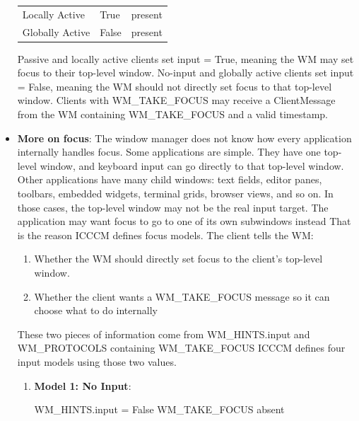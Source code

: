 \documentclass{report}
\begin{document}
\begin{itemize}
\begin{center}
\begin{tabularx}{\textwidth}{@{}Xll@{}}
                    Locally Active	&True	&present\\[2ex]
                    Globally Active	&False	&present\\
                    \bottomrule
                \end{tabularx}
            \end{center}
            Passive and locally active clients set input = True, meaning the WM may set focus to their top-level window. No-input and globally active clients set input = False, meaning the WM should not directly set focus to that top-level window. Clients with WM\_TAKE\_FOCUS may receive a ClientMessage from the WM containing WM\_TAKE\_FOCUS and a valid timestamp.
        \item \textbf{More on focus}: The window manager does not know how every application internally handles focus.
            \bigbreak \noindent 
            Some applications are simple. They have one top-level window, and keyboard input can go directly to that top-level window.
            \bigbreak \noindent 
            Other applications have many child windows: text fields, editor panes, toolbars, embedded widgets, terminal grids, browser views, and so on. In those cases, the top-level window may not be the real input target. The application may want focus to go to one of its own subwindows instead
            \bigbreak \noindent 
            That is the reason ICCCM defines focus models. The client tells the WM:
            \begin{enumerate}
                \item Whether the WM should directly set focus to the client’s top-level window.
                \item Whether the client wants a WM\_TAKE\_FOCUS message so it can choose what to do internally
            \end{enumerate}
            These two pieces of information come from WM\_HINTS.input and WM\_PROTOCOLS containing WM\_TAKE\_FOCUS
            \bigbreak \noindent 
            ICCCM defines four input models using those two values.
            \begin{enumerate}
                \item \textbf{Model 1: No Input}:
                    \bigbreak \noindent 
                    \begin{cppcode}
                    WM_HINTS.input = False
                    WM_TAKE_FOCUS absent
                    \end{cppcode}
                    \bigbreak \noindent 

\end{enumerate}
\end{itemize}
\end{document}
